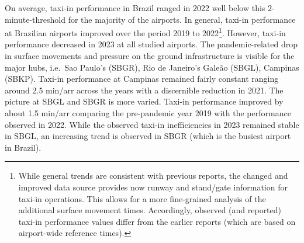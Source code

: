 \documentclass[
  a4paper,
  DIV=11,
  numbers=noendperiod]{scrreport}
\begin{document}
On average, taxi-in performance in Brazil ranged in 2022 well below this
2-minute-threshold for the majority of the airports. In general, taxi-in
performance at Brazilian airports improved over the period 2019 to
2022\footnote{While general trends are consistent with previous reports,
  the changed and improved data source provides now runway and
  stand/gate information for taxi-in operations. This allows for a more
  fine-grained analysis of the additional surface movement times.
  Accordingly, observed (and reported) taxi-in performance values differ
  from the earlier reports (which are based on airport-wide reference
  times).}. However, taxi-in performance decreased in 2023 at all
studied airports. The pandemic-related drop in surface movements and
pressure on the ground infrastructure is visible for the major hubs,
i.e.~Sao Paulo's (SBGR), Rio de Janeiro's Galeão (SBGL), Campinas
(SBKP). Taxi-in performance at Campinas remained fairly constant ranging
around 2.5 min/arr across the years with a discernible reduction in
2021. The picture at SBGL and SBGR is more varied. Taxi-in performance
improved by about 1.5 min/arr comparing the pre-pandemic year 2019 with
the performance observed in 2022. While the observed taxi-in
inefficiencies in 2023 remained stable in SBGL, an increasing trend is
observed in SBGR (which is the busiest airport in Brazil).
\end{document}
